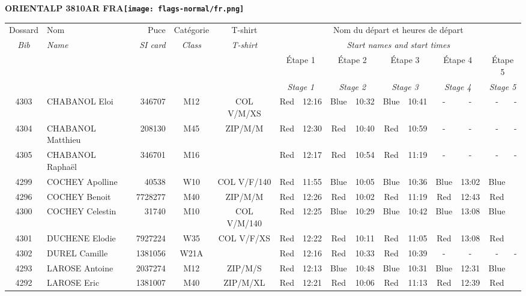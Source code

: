 \documentclass{report}
\begin{document}
\newpage
  \Huge \centering \bfseries ORIENTALP 3810AR FRA\normalfont \footnotesize \sffamily \hfill \texttt{[image: flags-normal/fr.png]} \newline 
  \begin{longtable}{|c|l|r|c|c|*{5}{cc|}}
    Dossard & Nom  & Puce    & Catégorie & T-shirt & \multicolumn{10}{c|}{Nom du départ et heures de départ} \\
    \itshape Bib     & \itshape Name & \itshape SI card & \itshape Class  & \itshape  T-shirt  & \multicolumn{10}{c|}{\itshape Start names and start times} \\
    \hline
    & & & & & \multicolumn{2}{c|}{Étape 1} & \multicolumn{2}{c|}{Étape 2} & \multicolumn{2}{c|}{Étape 3} & \multicolumn{2}{c|}{Étape 4} & \multicolumn{2}{c|}{Étape 5} \\
    & & & & & \multicolumn{2}{c|}{\itshape Stage 1} & \multicolumn{2}{c|}{\itshape Stage 2} & \multicolumn{2}{c|}{\itshape Stage 3} & \multicolumn{2}{c|}{\itshape Stage 4} & \multicolumn{2}{c|}{\itshape Stage 5} \\
    \hline
    4303 & CHABANOL Eloi & 346707 & M12 & COL V/M/XS & Red & 12:16 & Blue & 10:32 & Blue & 10:41 & - &  - & - &  -\\
    4304 & CHABANOL Matthieu & 208130 & M45 & ZIP/M/M & Red & 12:30 & Red & 10:40 & Red & 10:59 & - &  - & - &  -\\
    4305 & CHABANOL Raphaël & 346701 & M16 &   & Red & 12:17 & Red & 10:54 & Red & 11:19 & - &  - & - &  -\\
    4299 & COCHEY Apolline & 40538 & W10 & COL V/F/140 & Red & 11:55 & Blue & 10:05 & Blue & 10:36 & Blue & 13:02 & Blue &  \\
    4296 & COCHEY Benoit & 7728277 & M40 & ZIP/M/M & Red & 12:26 & Red & 10:02 & Red & 11:19 & Red & 12:43 & Red &  \\
    4300 & COCHEY Celestin & 31740 & M10 & COL V/M/140 & Red & 12:25 & Blue & 10:29 & Blue & 10:42 & Blue & 13:08 & Blue &  \\
    4301 & DUCHENE Elodie & 7927224 & W35 & COL V/F/XS & Red & 12:22 & Red & 10:11 & Red & 11:05 & Red & 13:08 & Red &  \\
    4302 & DUREL Camille & 1381056 & W21A &   & Red & 12:16 & Red & 10:33 & Red & 10:39 & - &  - & - &  -\\
    4293 & LAROSE Antoine & 2037274 & M12 & ZIP/M/S & Red & 12:13 & Blue & 10:48 & Blue & 10:31 & Blue & 12:31 & Blue &  \\
    4292 & LAROSE Eric & 1381007 & M40 & ZIP/M/XL & Red & 12:21 & Red & 10:06 & Red & 11:13 & Red & 12:39 & Red &  \\

\end{longtable}
\end{document}

